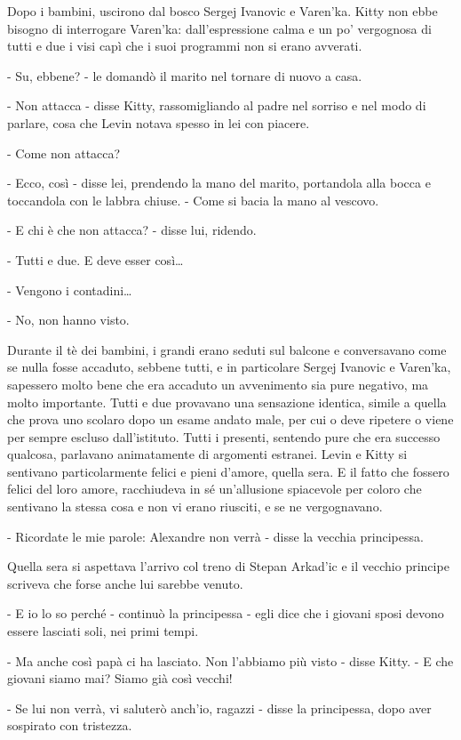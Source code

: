 Dopo i bambini, uscirono dal bosco Sergej Ivanovic e Varen'ka. Kitty non ebbe bisogno di interrogare Varen'ka: dall'espressione calma e un po' vergognosa di tutti e due i visi capì che i suoi programmi non si erano avverati. 

- Su, ebbene? - le domandò il marito nel tornare di nuovo a casa. 

- Non attacca - disse Kitty, rassomigliando al padre nel sorriso e nel modo di parlare, cosa che Levin notava spesso in lei con piacere. 

- Come non attacca? 

- Ecco, così - disse lei, prendendo la mano del marito, portandola alla bocca e toccandola con le labbra chiuse. - Come si bacia la mano al vescovo. 

- E chi è che non attacca? - disse lui, ridendo. 

- Tutti e due. E deve esser così\ldots{} 

- Vengono i contadini\ldots{} 

- No, non hanno visto. 

Durante il tè dei bambini, i grandi erano seduti sul balcone e conversavano come se nulla fosse accaduto, sebbene tutti, e in particolare Sergej Ivanovic e Varen'ka, sapessero molto bene che era accaduto un avvenimento sia pure negativo, ma molto importante. Tutti e due provavano una sensazione identica, simile a quella che prova uno scolaro dopo un esame andato male, per cui o deve ripetere o viene per sempre escluso dall'istituto. Tutti i presenti, sentendo pure che era successo qualcosa, parlavano animatamente di argomenti estranei. Levin e Kitty si sentivano particolarmente felici e pieni d'amore, quella sera. E il fatto che fossero felici del loro amore, racchiudeva in sé un'allusione spiacevole per coloro che sentivano la stessa cosa e non vi erano riusciti, e se ne vergognavano. 

- Ricordate le mie parole: Alexandre non verrà - disse la vecchia principessa. 

Quella sera si aspettava l'arrivo col treno di Stepan Arkad'ic e il vecchio principe scriveva che forse anche lui sarebbe venuto. 

- E io lo so perché - continuò la principessa - egli dice che i giovani sposi devono essere lasciati soli, nei primi tempi. 

- Ma anche così papà ci ha lasciato. Non l'abbiamo più visto - disse Kitty. - E che giovani siamo mai? Siamo già così vecchi! 

- Se lui non verrà, vi saluterò anch'io, ragazzi - disse la principessa, dopo aver sospirato con tristezza. 

